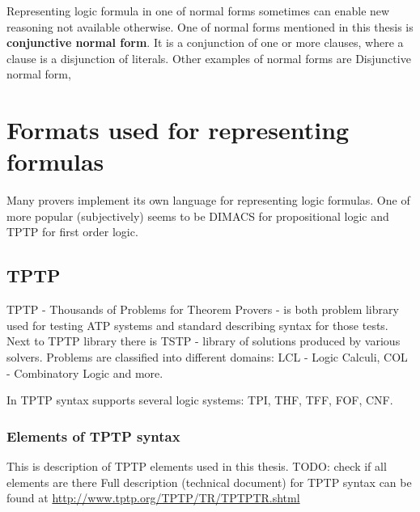 Representing logic formula in one of normal forms sometimes can enable new reasoning not available otherwise. One of normal forms mentioned in this thesis is \textbf{conjunctive normal form}. It is a conjunction of one or more clauses, where a clause is a disjunction of literals. Other examples of normal forms are Disjunctive normal form, 

\section{Formats used for representing formulas}

Many provers implement its own language for representing logic formulas. One of more popular (subjectively)  seems to be DIMACS for propositional logic and TPTP for first order logic.

\subsection{TPTP}

\gls{TPTP} \cite{Sut17} - Thousands of Problems for Theorem Provers - is both problem library used for testing \gls{ATP} systems and standard describing syntax for those tests. Next to TPTP library there is \gls{TSTP} - library of solutions produced by various solvers. Problems are classified into different domains: LCL - Logic Calculi, COL - Combinatory Logic and more.

In TPTP syntax supports several logic systems: \gls{TPI}, \gls{THF}, \gls{TFF}, \gls{FOF}, \gls{CNF}. 

\subsubsection{Elements of TPTP syntax}

This is description of TPTP elements used in this thesis. TODO: check if all elements are there
\newline
Full description (technical document) for TPTP syntax can be found at \url{http://www.tptp.org/TPTP/TR/TPTPTR.shtml}


